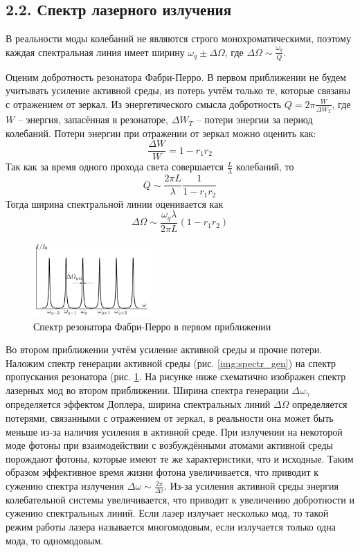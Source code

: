 \subsection*{2.2. Спектр лазерного излучения}

В реальности моды колебаний не являются строго монохроматическими, поэтому каждая спектральная линия имеет ширину $\omega_q \pm \Delta \Omega$, где $\Delta \Omega \sim \frac{\omega_q}{Q}$.

Оценим добротность резонатора Фабри-Перро. В первом приближении не будем учитывать усиление активной среды, из потерь учтём только те, которые связаны с отражением от зеркал. Из энергетического смысла добротность $Q = 2\pi \frac{W}{\Delta W_T}$, где $W$ -- энергия, запасённая в резонаторе, $\Delta W_T$ -- потери энергии за период колебаний. Потери энергии при отражении от зеркал можно оценить как:
$$
\frac{\Delta W}{W} = 1 - r_1 r_2
$$
Так как за время одного прохода света совершается $\frac{L}{\lambda}$ колебаний, то
$$
Q \sim \frac{2 \pi L}{\lambda} \frac{1}{1 - r_1 r_2}
$$
Тогда ширина спектральной линии оценивается как 
$$
\Delta \Omega \sim \frac{\omega_q \lambda}{2 \pi L} (1 - r_1 r_2)
$$

\begin{figure}[H]
	\centering
	\includegraphics[width=0.4\textwidth]{../Изображения/Спектр1.png}
	\caption{Спектр резонатора Фабри-Перро в первом приближении}
	\label{img:spectr_pass}
\end{figure}

Во втором приближении учтём усиление активной среды и прочие потери. Наложим спектр генерации активной среды (рис. \ref{img:spectr_gen}) на спектр пропускания резонатора (рис. \ref{img:spectr_pass}. На рисунке ниже схематично изображен спектр лазерных мод во втором приближении. Ширина спектра генерации $\Delta \omega_\gamma$ определяется эффектом Доплера, ширина спектральных линий $\Delta \Omega$ определяется потерями, связанными с отражением от зеркал, в реальности она может быть меньше из-за наличия усиления в активной среде. При излучении на некоторой моде фотоны при взаимодействии с возбуждёнными атомами активной среды порождают фотоны, которые имеют те же характеристики, что и исходные. Таким образом эффективное время жизни фотона увеличивается, что приводит к сужению спектра излучения $\Delta \omega \sim \frac{2 \pi}{\Delta \tau}$. Из-за усиления активной среды энергия колебательной системы увеличивается, что приводит к увеличению добротности и сужению спектральных линий. Если лазер излучает несколько мод, то такой режим работы лазера называется многомодовым, если излучается только одна мода, то одномодовым.

